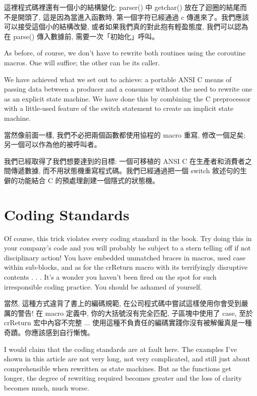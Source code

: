 \documentclass[12pt]{article}
\begin{document}
\begin{CJK}{UTF8}{bsmi}
這裡程式碼裡還有一個小的結構變化: parser() 中 getchar() 放在了迴圈的結尾而不是開頭了, 這是因為當進入函數時, 第一個字符已經通過 c
傳進來了。我們應該可以接受這個小的結構改變, 或者如果我們真的對此抱有輕盈態度, 我們可以認為在 parse()
傳入數據前, 需要一次「初始化」呼叫。 

As before, of course, we don't have to rewrite both routines using the coroutine macros. One will suffice; the other can be its caller.

We have achieved what we set out to achieve: a portable ANSI C means of passing data between a producer and a consumer without the need to rewrite one as an explicit state machine. We have done this by combining the C preprocessor with a little-used feature of the switch statement to create an implicit state machine.

當然像前面一樣, 我們不必把兩個函數都使用協程的 macro 重寫, 修改一個足矣; 另一個可以作為他的被呼叫者。

我們已經取得了我們想要達到的目標: 一個可移植的 ANSI C 在生產者和消費者之間傳遞數據, 而不用狀態機重寫程式碼。我們已經通過把一個
switch 敘述句的生僻的功能結合 C 的預處理創建一個隱式的狀態機。 

\section{Coding Standards}

Of course, this trick violates every coding standard in the book. Try doing this in your company's code and you will probably be subject to a stern telling off if not disciplinary action! You have embedded unmatched braces in macros, used case within sub-blocks, and as for the crReturn macro with its terrifyingly disruptive contents . . . It's a wonder you haven't been fired on the spot for such irresponsible coding practice. You should be ashamed of yourself.

當然, 這種方式違背了書上的編碼規範, 在公司程式碼中嘗試這樣使用你會受到嚴厲的警告! 在 macro 定義中, 你的大括號沒有完全匹配, 子區塊中使用了 case, 至於 crReturn 宏中內容不完整 ... 使用這種不負責任的編碼實踐你沒有被解僱真是一種奇蹟。你應該感到自行慚愧。 

I would claim that the coding standards are at fault here. The examples I've shown in this article are not very long, not very complicated, and still just about comprehensible when rewritten as state machines. But as the functions get longer, the degree of rewriting required becomes greater and the loss of clarity becomes much, much worse.


\end{CJK}
\end{document}
